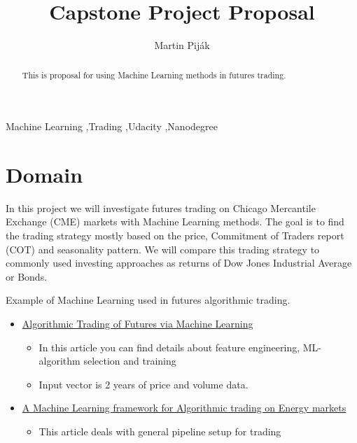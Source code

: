 \documentclass[final,2p]{elsarticle}
\begin{document}
\begin{frontmatter}

\title{Capstone Project Proposal}

\author{Martin Pij{\'a}k}

\address{Bratislava, Slovakia}

\begin{abstract}
This is proposal for using Machine Learning methods in futures trading.
\end{abstract}

\begin{keyword}
Machine Learning \sep{Trading} \sep{Udacity} \sep{Nanodegree}

\end{keyword}

\end{frontmatter}


\section{Domain}

In this project we will investigate futures trading on Chicago Mercantile Exchange (CME) markets with Machine Learning methods. The goal is to find the trading strategy mostly based on the price, Commitment of Traders report (COT) and seasonality pattern. We will compare this trading strategy to commonly used investing approaches as returns of Dow Jones Industrial Average or Bonds.

Example of Machine Learning used in futures algorithmic trading.
\begin{itemize}
    \item \href{http://cs229.stanford.edu/proj2014/David\%20Montague,\%20Algorithmic\%20Trading\%20of\%20Futures\%20via\%20Machine\%20Learning.pdf}{Algorithmic Trading of Futures via Machine Learning}
        \begin{itemize}
            \item In this article you can find details about feature engineering, ML-algorithm selection and training
            \item Input vector is 2 years of price and volume data.
        \end{itemize}
    \item \href{https://towardsdatascience.com/https-medium-com-skuttruf-machine-learning-in-finance-algorithmic-trading-on-energy-markets-cb68f7471475}{A Machine Learning framework for Algorithmic trading on Energy markets}
        \begin{itemize}
            \item This article deals with general pipeline setup for trading
        \end{itemize}
\end{itemize}
\end{document}
